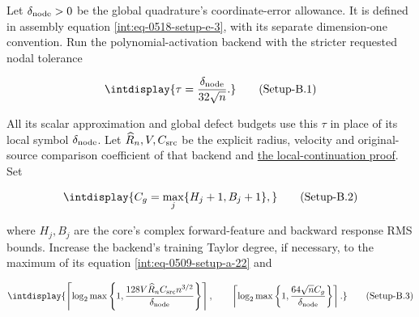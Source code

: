 
Let \(\delta_{\rm node}>0\) be the global quadrature's coordinate-error allowance. It is defined in assembly equation \hyperref[int:eq-setup-e-3]{\eqref{int:eq-0518-setup-e-3}}, with its separate dimension-one convention. Run the polynomial-activation backend with the stricter requested nodal tolerance


\label{int:eq-setup-b-1}
\begingroup\renewcommand{\theHequation}{intdisplay.1033}
\begin{equation}
\intdisplay{
\tau=\frac{\delta_{\rm node}}{32\sqrt n}.
}
\tag{Setup-B.1}
\label{int:eq-0542-setup-b-1}
\end{equation}
\endgroup


All its scalar approximation and global defect budgets use this \(\tau\) in place of its local symbol \(\delta_{\rm node}\). Let \(\widehat R_n,\allowbreak V,\allowbreak C_{\rm src}\) be the explicit radius, velocity and original-source comparison coefficient of that backend and \hyperref[int:setup-core]{the local-continuation proof}. Set


\label{int:eq-setup-b-2}
\begingroup\renewcommand{\theHequation}{intdisplay.1034}
\begin{equation}
\intdisplay{
C_g=\max_j\{H_j+1,B_j+1\},
}
\tag{Setup-B.2}
\label{int:eq-0543-setup-b-2}
\end{equation}
\endgroup


where \(H_j,\allowbreak B_j\) are the core's complex forward-feature and backward response RMS bounds. Increase the backend's training Taylor degree, if necessary, to the maximum of its equation \hyperref[int:eq-setup-a-22]{\eqref{int:eq-0509-setup-a-22}} and


\label{int:eq-setup-b-3}
\begingroup\renewcommand{\theHequation}{intdisplay.1035}
\begin{equation}
\intdisplay{
\left\lceil\log_2\max\left\{1,
 \frac{128V\widehat R_n C_{\rm src}n^{3/2}}{\delta_{\rm node}}
 \right\}\right\rceil,
\qquad
\left\lceil\log_2\max\left\{1,
 \frac{64\sqrt n C_g}{\delta_{\rm node}}
 \right\}\right\rceil.
}
\tag{Setup-B.3}
\label{int:eq-0544-setup-b-3}
\end{equation}
\endgroup

